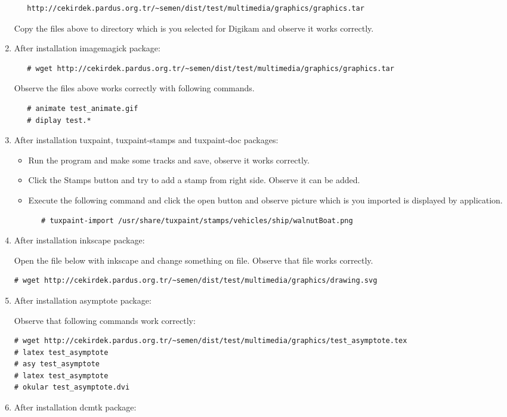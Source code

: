 \documentclass[a4paper,10pt]{article}
\begin{document}
\begin{enumerate}
  \begin{verbatim}
   http://cekirdek.pardus.org.tr/~semen/dist/test/multimedia/graphics/graphics.tar
  \end{verbatim}

 Copy the files above to directory which is you selected for Digikam and observe it works correctly.
\item After installation imagemagick package:
  \begin{verbatim}
   # wget http://cekirdek.pardus.org.tr/~semen/dist/test/multimedia/graphics/graphics.tar
  \end{verbatim}

Observe the files above works correctly with following commands.
  \begin{verbatim}
   # animate test_animate.gif
   # diplay test.*
  \end{verbatim}
\item After installation tuxpaint, tuxpaint-stamps and tuxpaint-doc packages:
  \begin{itemize}
   \item  Run the program and make some tracks and save, observe it works correctly.
   \item Click the Stamps button and try to add a stamp from right side. Observe it can be added.
   \item Execute the following command and click the open button and observe picture which is you imported is displayed by application.
\begin{verbatim}
   # tuxpaint-import /usr/share/tuxpaint/stamps/vehicles/ship/walnutBoat.png
\end{verbatim} 
\end{itemize}

\item After installation inkscape package:

Open the file below with inkscape and change something on file. Observe that file works correctly.
\begin{verbatim}
# wget http://cekirdek.pardus.org.tr/~semen/dist/test/multimedia/graphics/drawing.svg 
\end{verbatim}

\item After installation asymptote package:

Observe that following commands work correctly:
\begin{verbatim}
# wget http://cekirdek.pardus.org.tr/~semen/dist/test/multimedia/graphics/test_asymptote.tex
# latex test_asymptote
# asy test_asymptote
# latex test_asymptote
# okular test_asymptote.dvi
\end{verbatim}
\item  After installation dcmtk package:


\end{enumerate}
\end{document}
